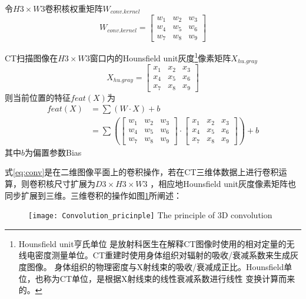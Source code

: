 令$H3 \times W3$卷积核权重矩阵$W_{conv.kernel}$
\begin{equation}
    W_{conv.kernel} = \begin{bmatrix}
        w_1 & w_2 & w_3 \\
        w_4 & w_5 & w_6 \\
        w_7 & w_8 & w_9
    \end{bmatrix}
\end{equation}

CT扫描图像在$H3 \times W3$窗口内的Hounsfield unit\cite{HU2016CT}灰度\footnote{Hounsfield unit亨氏单位
是放射科医生在解释CT图像时使用的相对定量的无线电密度测量单位。CT重建时使用身体组织对辐射的吸收/衰减系数来生成灰度图像。
身体组织的物理密度与X射线束的吸收/衰减成正比。Hounsfield单位，也称为CT单位，是根据X射线束的线性衰减系数进行线性
变换计算而来的。}像素矩阵$X_{hu.gray}$
\begin{equation}
    X_{hu.gray} = \begin{bmatrix}
        x_1 & x_2 & x_3 \\
        x_4 & x_5 & x_6 \\
        x_7 & x_8 & x_9
    \end{bmatrix}
\end{equation}
则当前位置的特征$feat(X)$为
\begin{equation}\label{eq:conv}
\begin{split}
    {feat}(X) &= \sum{\left(W \cdot X\right)} + b \\
            &= \sum{\left(\begin{bmatrix}
                        w_1 & w_2 & w_3 \\
                        w_4 & w_5 & w_6 \\
                        w_7 & w_8 & w_9
                    \end{bmatrix} \cdot 
                    \begin{bmatrix}
                        x_1 & x_2 & x_3 \\
                        x_4 & x_5 & x_6 \\
                        x_7 & x_8 & x_9
                    \end{bmatrix}\right)} + b
\end{split}
\end{equation}
其中$b$为偏置参数Bias

式\ref{eq:conv}是在二维图像平面上的卷积操作，若在CT三维体数据上进行卷积运算，则卷积核尺寸扩展为$D3 \times H3 \times W3$
，相应地Hounsfield unit灰度像素矩阵也同步扩展到三维。三维卷积的操作如图\ref{fig:3D_Conv}所阐述：
\begin{figure}[!htp]
    \centering
    \texttt{[image: Convolution\_pricinple]}
        {The principle of 3D convolution}
    \label{fig:3D_Conv}
\end{figure}

